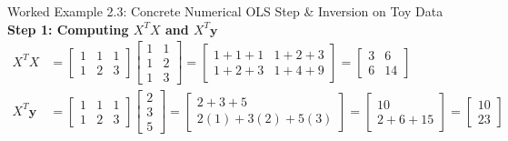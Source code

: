 \begin{examplebox}[breakable]{Worked Example 2.3: Concrete Numerical OLS Step \& Inversion on Toy Data}
\textbf{Step 1: Computing $X^T X$ and $X^T \mathbf{y}$}
\begin{align*}
X^T X &= \begin{bmatrix} 1 & 1 & 1 \\ 1 & 2 & 3 \end{bmatrix} \begin{bmatrix} 1 & 1 \\ 1 & 2 \\ 1 & 3 \end{bmatrix} = \begin{bmatrix} 1+1+1 & 1+2+3 \\ 1+2+3 & 1+4+9 \end{bmatrix} = \begin{bmatrix} 3 & 6 \\ 6 & 14 \end{bmatrix} \\
X^T \mathbf{y} &= \begin{bmatrix} 1 & 1 & 1 \\ 1 & 2 & 3 \end{bmatrix} \begin{bmatrix} 2 \\ 3 \\ 5 \end{bmatrix} = \begin{bmatrix} 2 + 3 + 5 \\ 2(1) + 3(2) + 5(3) \end{bmatrix} = \begin{bmatrix} 10 \\ 2 + 6 + 15 \end{bmatrix} = \begin{bmatrix} 10 \\ 23 \end{bmatrix}
\end{align*}


\end{examplebox}
